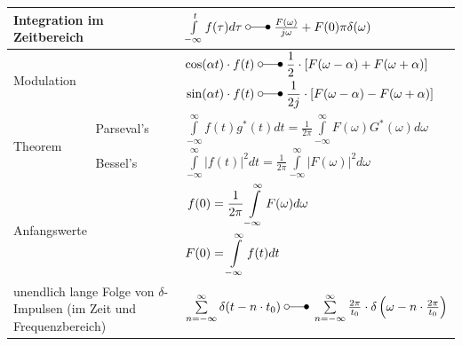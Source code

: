 \begin{tabular}{|p{3cm}|p{6.5cm}p{8.5cm}|}
   			\multicolumn{2}{|l}{Integration im Zeitbereich} & $\int\limits_{-\infty}^{t}f(\tau)d\tau \; \laplace \;
   			\frac{F(\omega)}{j\omega}+F(0)\pi\delta(\omega)$\\ 
   		\hline
   		\hline
   			\multicolumn{2}{|l}{Modulation} & 
   				\begin{math}
   					\begin{aligned}
	   					\cos(\alpha t) \cdot f(t)  \; &\laplace \;  \frac{1}{2}\cdot
	   					\left[F(\omega-\alpha) + F(\omega+\alpha)\right]\\
	   					\sin(\alpha t) \cdot f(t) \; &\laplace \; \frac{1}{2j}\cdot \left[F(\omega-\alpha) - F(\omega+\alpha)\right]
   					\end{aligned}
   				\end{math}	\\ 
   		\hline
   		\hline
   			\multirow{2}{*}{Theorem} & Parseval's & 			 			$\int\limits_{-\infty}^{\infty}f(t)g^{\ast}(t)dt = \frac{1}{2\pi}
   			\int\limits_{-\infty}^{\infty}F(\omega)G^{\ast}(\omega)d\omega$\\ 
   			\cline{2-3} 
   			& Bessel's & $\int\limits_{-\infty}^{\infty}|f(t)|^2 dt = \frac{1}{2\pi}
   			\int\limits_{-\infty}^{\infty}|F(\omega)|^2 d\omega$ \\ 
   		\hline
   		\hline
		   	\multicolumn{2}{|l}{Anfangswerte} & 
		   	\begin{math}
			   	\begin{aligned}
				   	f(0)&=\frac{1}{2\pi}\int\limits_{-\infty}^{\infty}F(\omega)d\omega
				   	\hspace*{1cm}\\
				   	F(0)&=\int\limits_{-\infty}^{\infty}f(t)dt
			   	\end{aligned}
		   	\end{math} \\
		\hline
		\hline
		   	\multicolumn{2}{|l}{unendlich lange Folge von $\delta$-Impulsen (im Zeit und Frequenzbereich)} 
               & $\sum\limits_{n=-\infty}^{\infty} \delta(t-n\cdot t_0) \; \laplace \;
		   	\sum\limits_{n=-\infty}^{\infty} \frac{2\pi}{t_0}\cdot\delta\left(\omega-n\cdot
		   	\frac{2\pi}{t_0}\right)$ \\ 
		\hline
	\end{tabular}
	\renewcommand{\arraystretch}{\arraystretchOriginal}




